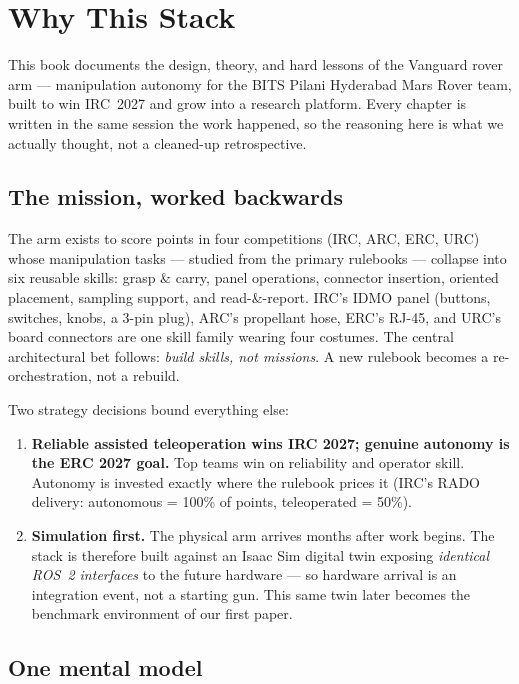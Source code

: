 \chapter{Why This Stack}
\label{ch:why}

This book documents the design, theory, and hard lessons of the Vanguard rover arm ---
manipulation autonomy for the BITS Pilani Hyderabad Mars Rover team, built to win IRC~2027 and
grow into a research platform. Every chapter is written in the same session the work happened,
so the reasoning here is what we actually thought, not a cleaned-up retrospective.

\section{The mission, worked backwards}

The arm exists to score points in four competitions (IRC, ARC, ERC, URC) whose manipulation
tasks --- studied from the primary rulebooks --- collapse into six reusable skills: grasp \&
carry, panel operations, connector insertion, oriented placement, sampling support, and
read-\&-report. IRC's IDMO panel (buttons, switches, knobs, a 3-pin plug), ARC's propellant
hose, ERC's RJ-45, and URC's board connectors are one skill family wearing four costumes. The
central architectural bet follows: \emph{build skills, not missions}. A new rulebook becomes a
re-orchestration, not a rebuild.

Two strategy decisions bound everything else:
\begin{enumerate}
  \item \textbf{Reliable assisted teleoperation wins IRC 2027; genuine autonomy is the ERC 2027
  goal.} Top teams win on reliability and operator skill. Autonomy is invested exactly where the
  rulebook prices it (IRC's RADO delivery: autonomous = 100\% of points, teleoperated = 50\%).
  \item \textbf{Simulation first.} The physical arm arrives months after work begins. The stack
  is therefore built against an Isaac Sim digital twin exposing \emph{identical ROS~2
  interfaces} to the future hardware --- so hardware arrival is an integration event, not a
  starting gun. This same twin later becomes the benchmark environment of our first paper.
\end{enumerate}

\section{One mental model}
\label{sec:mental-model}

